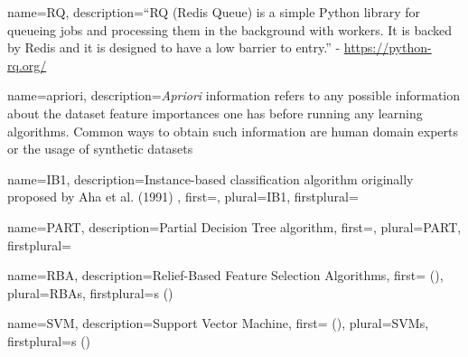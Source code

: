 

\makenoidxglossaries





{
    name={RQ},
    description={``RQ (Redis Queue) is a simple Python library for queueing jobs and processing them in the background with workers. It is backed by Redis and it is designed to have a low barrier to entry.'' - \href{source}{https://python-rq.org/}}
}

{
    name={apriori},
    description={\textit{Apriori} information refers to any possible information about the dataset feature importances one has before running any learning algorithms. Common ways to obtain such information are human domain experts or the usage of synthetic datasets}
}

{
  name={IB1},
  description={Instance-based classification algorithm originally proposed by Aha et al. (1991) \citep{aha_instance-based_1991}},
  first={},
  plural={IB1},
  firstplural={}
}

{
  name={PART},
  description={Partial Decision Tree algorithm},
  first={},
  plural={PART},
  firstplural={}
}

{
  name={RBA},
  description={Relief-Based Feature Selection Algorithms},
  first={ ()},
  plural={RBAs},
  firstplural={s ()}
}

{
  name={SVM},
  description={Support Vector Machine},
  first={ ()},
  plural={SVMs},
  firstplural={s ()}
}